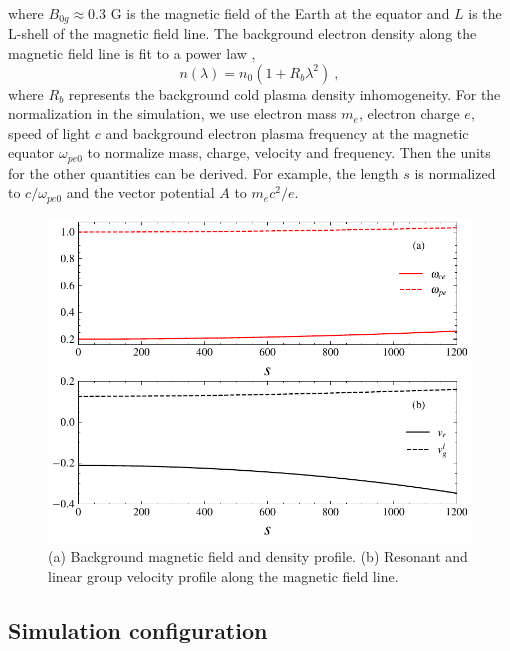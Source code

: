 where $B_{0g}\approx $0.3 G is the magnetic field of the Earth  at the equator 
and $L$ is the L-shell of the magnetic field line.
The background electron density along the magnetic field line  is  fit to a power law \cite{denton2004},
\begin{equation}
    n(\lambda) = n_0 (1+R_b \lambda^2)~,
\end{equation}
where $R_b$ represents the 
background cold plasma density inhomogeneity.
For the normalization in the simulation, 
 we use electron mass $m_e$, electron charge $e$, speed of light $c$ and background electron plasma frequency at the magnetic equator $\omega_{pe0}$ to normalize mass, charge, velocity and frequency.
Then the  units for the other quantities can be derived. 
For example,
the length $s $ is normalized to $ c/\omega_{pe0}$
and 
 the vector potential $A$ to $m_e c^2/e$.




   \begin{figure}[htbp]
        \centering
        \includegraphics[scale=0.5]{cpc_img/fig_profile.pdf}
        \caption{(a) Background magnetic field and density profile. (b) Resonant and linear group velocity profile along the magnetic field line.}
        \label{fig.profile}
    \end{figure}
\subsection{Simulation configuration}

